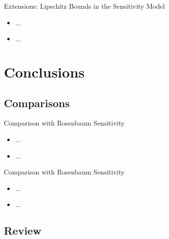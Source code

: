 \documentclass{beamer}
\begin{document}

\begin{frame}{Extensions: Lipschitz Bounds in the Sensitivity Model}

\begin{itemize}
  \itemsep12pt
  \item ...
  \item ...
\end{itemize}

\end{frame}

\section{Conclusions}
\subsection{Comparisons}

\begin{frame}{Comparison with Rosenbaum Sensitivity}

\begin{itemize}
  \itemsep12pt
  \item ...
  \item ...
\end{itemize}

\end{frame}


\begin{frame}{Comparison with Rosenbaum Sensitivity}

\begin{itemize}
  \itemsep12pt
  \item ...
  \item ...
\end{itemize}

\end{frame}

\subsection{Review}
\end{document}
